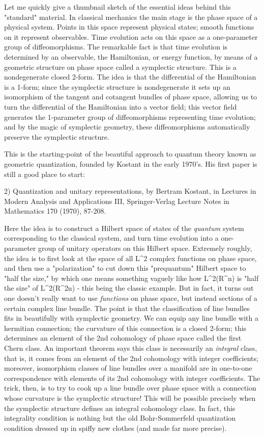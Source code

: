 Let me quickly give a thumbnail sketch of the essential ideas behind
this "standard" material.  In classical mechanics the main stage is
the phase space of a physical system.  Points in this space represent
physical states; smooth functions on it represent observables.  
Time evolution acts on this space as a one-parameter group of
diffeomorphisms.  The remarkable fact is that time evolution is
determined by an observable, the Hamiltonian, or energy function, by
means of a geometric structure on phase space called a symplectic
structure.  This is a nondegenerate closed 2-form.  The idea is that the
differential of the Hamiltonian is a 1-form; since the symplectic
structure is nondegenerate it sets up an isomorphism of the tangent and
cotangent bundles of phase space, allowing us to turn the differential
of the Hamiltonian into a vector field; this vector field generates the
1-parameter group of diffeomorphisms representing time evolution; and by
the magic of symplectic geometry, these diffeomorphisms automatically
preserve the symplectic structure.  

This is the starting-point of the beautiful approach to quantum theory
known as geometric quantization, founded by Kostant in the early 1970's.
His first paper is still a good place to start:

2) Quantization and unitary representations, by Bertram Kostant, in
Lectures in Modern Analysis and Applications III, Springer-Verlag
Lecture Notes in Mathematics 170 (1970), 87-208.

Here the idea is to construct a Hilbert space of states of the \emph{quantum}
system corresponding to the classical system, and turn time evolution
into a one-parameter group of unitary operators on this Hilbert space.
Extremely roughly, the idea is to first look at the space of all L^2
complex functions on phase space, and then use a "polarization" to cut
down this "prequantum" Hilbert space to "half the size," by which one
means something vaguely like how L^2(R^n) is "half the size" of
L^2(R^{2n}) - this being the classic example.  But in fact, it turns out
one doesn't really want to use \emph{functions} on phase space, but instead
sections of a certain complex line bundle.  The point is that the
classification of line bundles fits in beautifully with symplectic
geometry.  We can equip any line bundle with a hermitian connection; the
curvature of this connection is a closed 2-form; this determines an
element of the 2nd cohomology of phase space called the first Chern
class.  An important theorem says this class is necessarily an
\emph{integral} class, that is, it comes from an element of the 2nd
cohomology with integer coefficients; moreover, isomorphism classes of
line bundles over a manifold are in one-to-one correspondence with
elements of its 2nd cohomology with integer coefficients.  The trick,
then, is to try to cook up a line bundle over phase space with a
connection whose curvature is the symplectic structure!  This will be
possible precisely when the symplectic structure defines an integral
cohomology class.  In fact, this integrality condition is nothing but
the old Bohr-Sommerfeld quantization condition dressed up in spiffy new
clothes (and made far more precise).  

